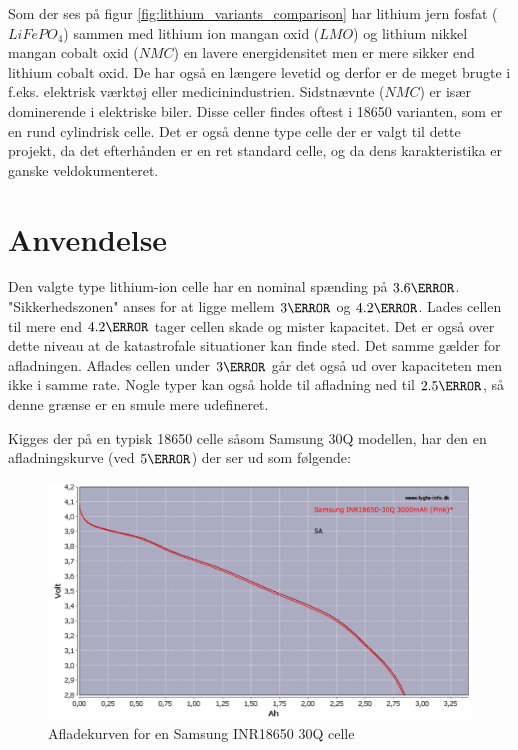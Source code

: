 Som der ses på figur \ref{fig:lithium_variants_comparison} har lithium jern fosfat ($LiFePO_4$) sammen med lithium ion mangan oxid ($LMO$) og lithium nikkel mangan cobalt oxid ($NMC$) en lavere energidensitet men er mere sikker end lithium cobalt oxid. De har også en længere levetid og derfor er de meget brugte i f.eks. elektrisk værktøj eller medicinindustrien. Sidstnævnte ($NMC$) er især dominerende i elektriske biler. Disse celler findes oftest i 18650 varianten, som er en rund cylindrisk celle. Det er også denne type celle der er valgt til dette projekt, da det efterhånden er en ret standard celle, og da dens karakteristika er ganske veldokumenteret. 


\section{Anvendelse}
Den valgte type lithium-ion celle har en nominal spænding på $3.6\volt$. "Sikkerhedszonen" \space anses for at ligge mellem $3\volt$ og $4.2\volt$. Lades cellen til mere end $4.2\volt$ tager cellen skade og mister kapacitet. Det er også over dette niveau at de katastrofale situationer kan finde sted. Det samme gælder for afladningen. Aflades cellen under $3\volt$ går det også ud over kapaciteten men ikke i samme rate. Nogle typer kan også holde til afladning ned til $2.5\volt$, så denne grænse er en smule mere udefineret.\\

Kigges der på en typisk 18650 celle såsom Samsung 30Q modellen, har den en afladningskurve (ved $5\ampere$) der ser ud som følgende: 

\begin{figure}[h]
\centering
\includegraphics[width=15cm]{billeder/samsung-inr18650-discharge.png}
\caption{Afladekurven for en Samsung INR18650 30Q celle\protect\footnotemark}
\label{fig:30q_discharge}
\end{figure}

